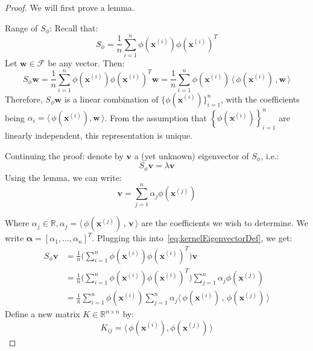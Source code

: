 \documentclass{article}
\begin{document}
\begin{theorem} \hphantom{}

  \noindent{} 

\begin{proof}
We will first prove a lemma.
\begin{lemma}{Range of $S_{\phi}$}:  Recall that:
\[
  S_{\phi} = \frac{1}{n} \sum_{i=1}^{n} \phi(\bm{x}^{(i)}) \phi(\bm{x}^{(i)})^T
\]
Let $\bm{w} \in \mathcal{F}$ be any vector. Then:
\[
S_{\phi} \bm{w} = \frac{1}{n} \sum_{i=1}^{n} \phi(\bm{x}^{(i)}) \phi(\bm{x}^{(i)})^T \bm{w} = \frac{1}{n} \sum_{i=1}^{n} \phi(\bm{x}^{(i)}) \, \langle \, \phi(\bm{x}^{(i)}) \,, \bm{w} \, \rangle
\]
Therefore, $S_{\phi} \bm{w}$ is a linear combination of $\{  \phi(\bm{x}^{(i)}) \}_{i=1}^{n}$, with the coefficients being  $\alpha_i= \langle \, \phi(\bm{x}^{(i)}), \bm{w} \, \rangle$. 
From the assumption that $\left\{  \phi(\bm{x}^{(i)}) \right\}_{i=1}^{n}$ are linearly independent, this representation is unique. 
\end{lemma}

Continuing the proof: denote by $\bm{v}$ a (yet unknown) eigenvector of $S_{\phi}$, i.e.:
\begin{equation} \label{eq:kernelEigenvectorDef}
  S_{\phi} \bm{v} = \lambda \bm{v}
\end{equation}
Using the lemma, we can write:
  \begin{equation} 
  \bm{v} = \sum_{j=1}^{n} \alpha_{j} \phi(\bm{x}^{(j)})
\end{equation}

Where $\alpha_j  \in \mathbb{R}, \alpha_j = \langle \, \phi(\bm{x}^{(j)}) \,, \, \bm{v} \, \rangle$ are the coefficients we wish to determine. We write $\bm{\alpha}=[\alpha_{1}, \ldots, \alpha_n]^T$.  Plugging this into~\cref{eq:kernelEigenvectorDef}, we get:
\begin{align*}
  S_{\phi} \bm{v} &= \frac{1}{n} \Big( \sum_{i=1}^{n} \phi(\bm{x}^{(i)}) \phi(\bm{x}^{(i)})^T \Big)  \bm{v} \\
  &= \frac{1}{n} \Big( \sum_{i=1}^{n} \phi(\bm{x}^{(i)}) \phi(\bm{x}^{(i)})^T \Big)  \sum_{j=1}^{n} \alpha_j \phi(\bm{x}^{(j)})  \\
  &= \frac{1}{n} \sum_{i=1}^{n} \phi(\bm{x}^{(i)}) \sum_{j=1}^{n} \alpha_{j} \langle \, \phi(\bm{x}^{(i)}) \,, \, \phi(\bm{x}^{(j)}) \, \rangle
\end{align*}
Define a new matrix $K \in \mathbb{R}^{n \times  n}$ by:
\[
  K_{ij} = \langle \, \phi(\bm{x}^{(i)}), \phi(\bm{x}^{(j)}) \, \rangle
\]


\end{proof}
\end{theorem}
\end{document}

